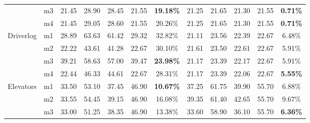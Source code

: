 \documentclass{article}
\theoremstyle{remark}
\begin{document}
\begin{table}[ht]
\begin{tabular}{|c|c|c|c|c|c|c||c|c|c|c|c|}
                                 & m3                          & 21.45        & 28.90        & 28.45             & 21.55             & \textbf{19.18\%} & 21.25        & 21.65        & 21.30             & 21.55             & \textbf{0.71\%} \\ \cline{2-12} 
                                 & m4                          & 21.45        & 29.05        & 28.60             & 21.55             & 20.26\%          & 21.25        & 21.65        & 21.30             & 21.55             & \textbf{0.71\%} \\ \hline
\multirow{4}{*}{Driverlog}       & m1                          & 28.89        & 63.63        & 61.42             & 29.32             & 32.82\%          & 21.11        & 23.56        & 22.39             & 22.67             & 6.48\%          \\ \cline{2-12} 
                                 & m2                          & 22.22        & 43.61        & 41.28             & 22.67             & 30.10\%          & 21.61        & 23.50        & 22.61             & 22.67             & 5.91\%          \\ \cline{2-12} 
                                 & m3                          & 39.21        & 58.63        & 57.00             & 39.47             & \textbf{23.98\%} & 21.17        & 23.39        & 22.17             & 22.67             & 5.91\%          \\ \cline{2-12} 
                                 & m4                          & 22.44        & 46.33        & 44.61             & 22.67             & 28.31\%          & 21.17        & 23.39        & 22.06             & 22.67             & \textbf{5.55\%} \\ \hline
\multirow{4}{*}{Elevators}       & m1                          & 33.50        & 53.10        & 37.45             & 46.90             & \textbf{10.67\%} & 37.25        & 61.75        & 39.90             & 55.70             & 6.88\%          \\ \cline{2-12} 
                                 & m2                          & 33.55        & 54.45        & 39.15             & 46.90             & 16.08\%          & 39.35        & 61.40        & 42.65             & 55.70             & 9.67\%          \\ \cline{2-12} 
                                 & m3                          & 33.00        & 51.25        & 38.35             & 46.90             & 13.38\%          & 33.60        & 58.90        & 36.10             & 55.70             & \textbf{6.36\%} \\ \cline{2-12} 

\end{tabular}
\end{table}
\end{document}
